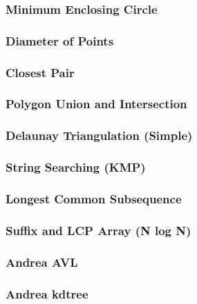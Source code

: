 \subsubsection*{Minimum Enclosing Circle}

\subsubsection*{Diameter of Points}

\subsubsection*{Closest Pair}

\subsubsection*{Polygon Union and Intersection}

\subsubsection*{Delaunay Triangulation (Simple)}

\subsubsection*{String Searching (KMP)}

\subsubsection*{Longest Common Subsequence}

\subsubsection*{Suffix and LCP Array (N log N)}

\subsubsection*{Andrea AVL}

\subsubsection*{Andrea kdtree}


